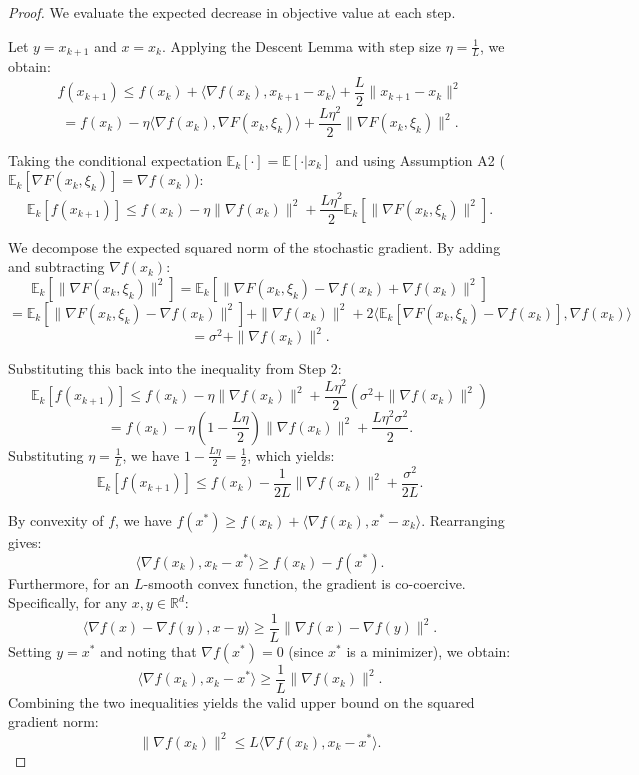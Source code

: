 \documentclass[11pt]{article}
\begin{document}
\begin{proof}
We evaluate the expected decrease in objective value at each step.

Let $y = x_{k+1}$ and $x = x_k$. Applying the Descent Lemma with step size $\eta = \frac{1}{L}$, we obtain:
\[
f(x_{k+1}) \le f(x_k) + \langle \nabla f(x_k), x_{k+1} - x_k \rangle + \frac{L}{2} \|x_{k+1} - x_k\|^2
\]
\[
= f(x_k) - \eta \langle \nabla f(x_k), \nabla F(x_k, \xi_k) \rangle + \frac{L \eta^2}{2} \|\nabla F(x_k, \xi_k)\|^2.
\]

Taking the conditional expectation $\mathbb{E}_k[\cdot] = \mathbb{E}[\cdot | x_k]$ and using Assumption A2 ($\mathbb{E}_k[\nabla F(x_k, \xi_k)] = \nabla f(x_k)$):
\[
\mathbb{E}_k[f(x_{k+1})] \le f(x_k) - \eta \|\nabla f(x_k)\|^2 + \frac{L \eta^2}{2} \mathbb{E}_k[\|\nabla F(x_k, \xi_k)\|^2].
\]

We decompose the expected squared norm of the stochastic gradient. By adding and subtracting $\nabla f(x_k)$:
\[
\mathbb{E}_k[\|\nabla F(x_k, \xi_k)\|^2] = \mathbb{E}_k[\|\nabla F(x_k, \xi_k) - \nabla f(x_k) + \nabla f(x_k)\|^2]
\]
\[
= \mathbb{E}_k[\|\nabla F(x_k, \xi_k) - \nabla f(x_k)\|^2] + \|\nabla f(x_k)\|^2 + 2\langle \mathbb{E}_k[\nabla F(x_k, \xi_k) - \nabla f(x_k)], \nabla f(x_k) \rangle
\]
\[
= \sigma^2 + \|\nabla f(x_k)\|^2.
\]

Substituting this back into the inequality from Step 2:
\[
\mathbb{E}_k[f(x_{k+1})] \le f(x_k) - \eta \|\nabla f(x_k)\|^2 + \frac{L \eta^2}{2} (\sigma^2 + \|\nabla f(x_k)\|^2)
\]
\[
= f(x_k) - \eta \left(1 - \frac{L \eta}{2}\right) \|\nabla f(x_k)\|^2 + \frac{L \eta^2 \sigma^2}{2}.
\]
Substituting $\eta = \frac{1}{L}$, we have $1 - \frac{L \eta}{2} = \frac{1}{2}$, which yields:
\[
\mathbb{E}_k[f(x_{k+1})] \le f(x_k) - \frac{1}{2L} \|\nabla f(x_k)\|^2 + \frac{\sigma^2}{2L}.
\]

By convexity of $f$, we have $f(x^*) \ge f(x_k) + \langle \nabla f(x_k), x^* - x_k \rangle$. Rearranging gives:
\[
\langle \nabla f(x_k), x_k - x^* \rangle \ge f(x_k) - f(x^*).
\]
Furthermore, for an $L$-smooth convex function, the gradient is co-coercive. Specifically, for any $x, y \in \mathbb{R}^d$:
\[
\langle \nabla f(x) - \nabla f(y), x - y \rangle \ge \frac{1}{L} \|\nabla f(x) - \nabla f(y)\|^2.
\]
Setting $y = x^*$ and noting that $\nabla f(x^*) = 0$ (since $x^*$ is a minimizer), we obtain:
\[
\langle \nabla f(x_k), x_k - x^* \rangle \ge \frac{1}{L} \|\nabla f(x_k)\|^2.
\]
Combining the two inequalities yields the valid upper bound on the squared gradient norm:
\[
\|\nabla f(x_k)\|^2 \le L \langle \nabla f(x_k), x_k - x^* \rangle.
\]


\end{proof}
\end{document}
